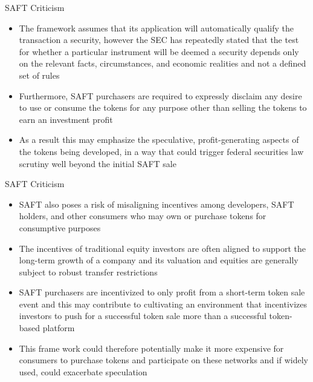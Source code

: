 \documentclass[9pt]{beamer}
\begin{document}

\begin{frame}{SAFT Criticism}
	\begin{itemize}
		\item The framework assumes that its application will automatically qualify the transaction a security, however the SEC has repeatedly stated that the test for whether a particular instrument will be deemed a security depends only on the relevant facts, circumstances, and economic realities and not a defined set of rules
		\item Furthermore, SAFT purchasers are required to expressly disclaim any desire to use or consume the tokens for any purpose other than selling the tokens to earn an investment profit
		\item As a result this may emphasize the speculative, profit-generating aspects of the tokens being developed, in a way that could trigger federal securities law scrutiny well beyond the initial SAFT sale
	\end{itemize}
\end{frame}


\begin{frame}{SAFT Criticism}
	\begin{itemize}
		\item SAFT also poses a risk of misaligning incentives among developers, SAFT holders, and other consumers who may own or purchase tokens for consumptive purposes
		\item The incentives of traditional equity investors are often aligned to support the long-term growth of a company and its valuation and equities are generally subject to robust transfer restrictions
		\item SAFT purchasers are incentivized to only profit from a short-term token sale event and this may contribute to cultivating an environment that incentivizes investors to push for a successful token sale more than a successful token-based platform
		\item This frame work could therefore potentially make it more expensive for consumers to purchase tokens and participate on these networks and if widely used, could exacerbate speculation
	\end{itemize}
\end{frame}

\end{document}
